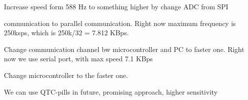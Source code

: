 Increase speed form 588 Hz to something higher by change ADC from SPI 

communication to parallel communication. Right now maximum frequency is 
250ksps, which is 250k/32 = 7.812 KBps.

 Change communication channel bw microcontroller and PC to faster one. Right 
 now we use serial port, with max speed 7.1 KBps 
 
Change microcontroller to the faster one. 

We can use QTC-pills in future, promising approach, higher sensitivity 